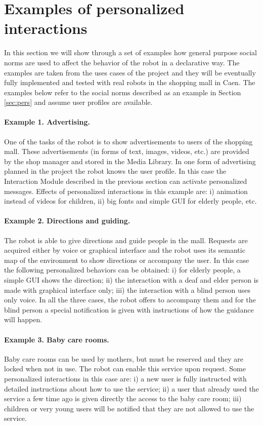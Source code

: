 \vspace{-0.2cm}
\section{Examples of personalized interactions}
\vspace{-0.1cm}
In this section we will show through a set of examples how general purpose social norms are used to affect the behavior of the robot in a declarative way. The examples are taken from the uses cases of the \coaches project and they will be eventually fully implemented and tested with real robots in the shopping mall in Caen. The examples below refer to the social norms described as an example in Section \ref{sec:pers} and assume user profiles are available.

\paragraph{Example 1. Advertising.} One of the tasks of the \coaches robot is to show advertisements to users of the shopping mall. These advertisements (in forms of text, images, videos, etc.) are provided by the shop manager and stored in the Media Library. 
In one form of advertising planned in the project the robot knows the user profile. In this case the Interaction Module described in the previous section can activate personalized messages.
Effects of personalized interactions in this example are: i) animation instead of videos for children, ii) big fonts and simple GUI for elderly people, etc. 

\paragraph{Example 2. Directions and guiding.} The robot is able to give directions and guide people in the mall. Requests are acquired either by voice or graphical interface and the robot uses its semantic map of the environment to show directions or accompany the user. In this case the following personalized behaviors can be obtained: i) for elderly people, a simple GUI shows the direction; ii) the interaction with a deaf and elder person is made with graphical interface only; iii) the interaction with a blind person uses only voice. In all the three cases, the robot offers to accompany them and for the blind person a special notification is given with instructions of how the guidance will happen.

\paragraph{Example 3. Baby care rooms.} Baby care rooms can be used by mothers, but must be reserved and they are locked when not in use. The robot can enable this service upon request. Some personalized interactions in this case are: i) a new user is fully instructed with detailed instructions about how to use the service; ii) a user that already used the service a few time ago is given directly the access to the baby care room; iii) children or very young users will be notified that they are not allowed to use the service.

